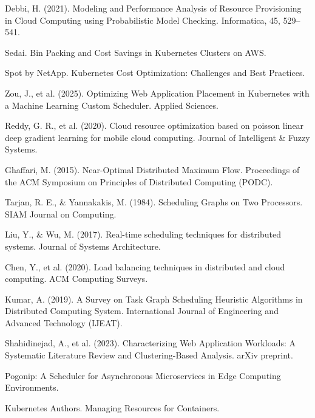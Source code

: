 \begin{thebibliography}{99}
	Debbi, H. (2021). Modeling and Performance Analysis of Resource Provisioning in Cloud Computing using Probabilistic Model Checking. Informatica, 45, 529–541.
	
	Sedai. Bin Packing and Cost Savings in Kubernetes Clusters on AWS.
	
	Spot by NetApp. Kubernetes Cost Optimization: Challenges and Best Practices.
	
	Zou, J., et al. (2025). Optimizing Web Application Placement in Kubernetes with a Machine Learning Custom Scheduler. Applied Sciences.
	
	Reddy, G. R., et al. (2020). Cloud resource optimization based on poisson linear deep gradient learning for mobile cloud computing. Journal of Intelligent \& Fuzzy Systems.
	
	Ghaffari, M. (2015). Near-Optimal Distributed Maximum Flow. Proceedings of the ACM Symposium on Principles of Distributed Computing (PODC).
	
	Tarjan, R. E., \& Yannakakis, M. (1984). Scheduling Graphs on Two Processors. SIAM Journal on Computing.
	
	Liu, Y., \& Wu, M. (2017). Real-time scheduling techniques for distributed systems. Journal of Systems Architecture.
	
	Chen, Y., et al. (2020). Load balancing techniques in distributed and cloud computing. ACM Computing Surveys.
	
	Kumar, A. (2019). A Survey on Task Graph Scheduling Heuristic Algorithms in Distributed Computing System. International Journal of Engineering and Advanced Technology (IJEAT).
	
	Shahidinejad, A., et al. (2023). Characterizing Web Application Workloads: A Systematic Literature Review and Clustering-Based Analysis. arXiv preprint.
	
	Pogonip: A Scheduler for Asynchronous Microservices in Edge Computing Environments.
	
	Kubernetes Authors. Managing Resources for Containers.
	
\end{thebibliography}